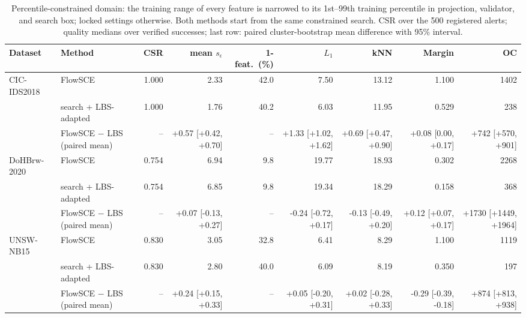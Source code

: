 \begin{table}[t]
\centering\footnotesize
\caption{Percentile-constrained domain: the training range of every feature is narrowed to its 1st--99th training percentile in projection, validator, and search box; locked settings otherwise. Both methods start from the same constrained search. CSR over the 500 registered alerts; quality medians over verified successes; last row: paired cluster-bootstrap mean difference with 95\% interval.}
\label{tab:a-constrained}
\begin{tabular}{@{}llrrrrrrr@{}}
\toprule
Dataset & Method & CSR & mean $s_\epsilon$ & 1-feat.\ (\%) & $L_1$ & kNN & Margin & OC \\
\midrule
CIC-IDS2018 & FlowSCE & 1.000 & 2.33 & 42.0 & 7.50 & 13.12 & 1.100 & 1402 \\
 & search + LBS-adapted & 1.000 & 1.76 & 40.2 & 6.03 & 11.95 & 0.529 & 238 \\
 & FlowSCE $-$ LBS (paired mean) & -- & +0.57 [+0.42, +0.70] & -- & +1.33 [+1.02, +1.62] & +0.69 [+0.47, +0.90] & +0.08 [0.00, +0.17] & +742 [+570, +901] \\
\midrule
DoHBrw-2020 & FlowSCE & 0.754 & 6.94 & 9.8 & 19.77 & 18.93 & 0.302 & 2268 \\
 & search + LBS-adapted & 0.754 & 6.85 & 9.8 & 19.34 & 18.29 & 0.158 & 368 \\
 & FlowSCE $-$ LBS (paired mean) & -- & +0.07 [-0.13, +0.27] & -- & -0.24 [-0.72, +0.17] & -0.13 [-0.49, +0.20] & +0.12 [+0.07, +0.17] & +1730 [+1449, +1964] \\
\midrule
UNSW-NB15 & FlowSCE & 0.830 & 3.05 & 32.8 & 6.41 & 8.29 & 1.100 & 1119 \\
 & search + LBS-adapted & 0.830 & 2.80 & 40.0 & 6.09 & 8.19 & 0.350 & 197 \\
 & FlowSCE $-$ LBS (paired mean) & -- & +0.24 [+0.15, +0.33] & -- & +0.05 [-0.20, +0.31] & +0.02 [-0.28, +0.33] & -0.29 [-0.39, -0.18] & +874 [+813, +938] \\
\bottomrule
\end{tabular}
\end{table}
